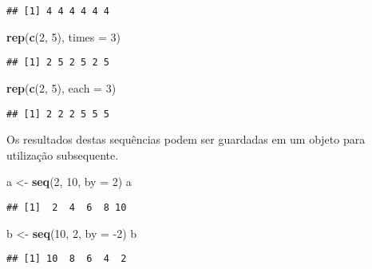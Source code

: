 \documentclass[
]{book}
\newenvironment{Shaded}{\begin{snugshade}}{\end{snugshade}}
\newcommand{\DataTypeTok}[1]{\textcolor[rgb]{0.13,0.29,0.53}{#1}}
\newcommand{\DecValTok}[1]{\textcolor[rgb]{0.00,0.00,0.81}{#1}}
\newcommand{\KeywordTok}[1]{\textcolor[rgb]{0.13,0.29,0.53}{\textbf{#1}}}
\newcommand{\NormalTok}[1]{#1}
\newcommand{\StringTok}[1]{\textcolor[rgb]{0.31,0.60,0.02}{#1}}
\begin{document}
\begin{verbatim}
## [1] 4 4 4 4 4 4
\end{verbatim}

\begin{Shaded}
\begin{Highlighting}[]
\KeywordTok{rep}\NormalTok{(}\KeywordTok{c}\NormalTok{(}\DecValTok{2}\NormalTok{, }\DecValTok{5}\NormalTok{), }\DataTypeTok{times =} \DecValTok{3}\NormalTok{)}
\end{Highlighting}
\end{Shaded}

\begin{verbatim}
## [1] 2 5 2 5 2 5
\end{verbatim}

\begin{Shaded}
\begin{Highlighting}[]
\KeywordTok{rep}\NormalTok{(}\KeywordTok{c}\NormalTok{(}\DecValTok{2}\NormalTok{, }\DecValTok{5}\NormalTok{), }\DataTypeTok{each =} \DecValTok{3}\NormalTok{)}
\end{Highlighting}
\end{Shaded}

\begin{verbatim}
## [1] 2 2 2 5 5 5
\end{verbatim}

Os resultados destas sequências podem ser guardadas em um objeto para utilização subsequente.

\begin{Shaded}
\begin{Highlighting}[]
\NormalTok{a <-}\StringTok{ }\KeywordTok{seq}\NormalTok{(}\DecValTok{2}\NormalTok{, }\DecValTok{10}\NormalTok{, }\DataTypeTok{by =} \DecValTok{2}\NormalTok{)}
\NormalTok{a}
\end{Highlighting}
\end{Shaded}

\begin{verbatim}
## [1]  2  4  6  8 10
\end{verbatim}

\begin{Shaded}
\begin{Highlighting}[]
\NormalTok{b <-}\StringTok{ }\KeywordTok{seq}\NormalTok{(}\DecValTok{10}\NormalTok{, }\DecValTok{2}\NormalTok{, }\DataTypeTok{by =} \DecValTok{-2}\NormalTok{)}
\NormalTok{b}
\end{Highlighting}
\end{Shaded}

\begin{verbatim}
## [1] 10  8  6  4  2
\end{verbatim}
\end{document}

